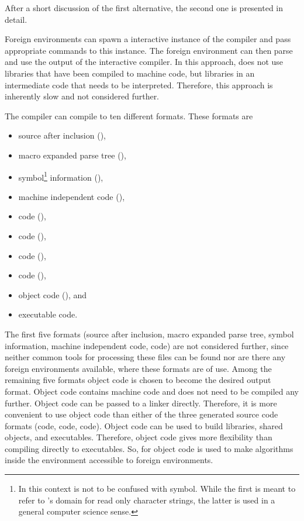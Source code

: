 After a short discussion of the first alternative, the second one is presented in detail.

Foreign environments can spawn a interactive instance of the \Aldor compiler and pass appropriate commands to this instance. The foreign environment can then parse and use the output of the interactive \Aldor compiler. In this approach, \Aldor does not use libraries that have been compiled to machine code, but libraries in an intermediate code that needs to be interpreted. Therefore, this approach is inherently slow and not considered further.

The \Aldor compiler can compile to ten different formats. These formats are
\begin{itemize}
\item source after inclusion (),
\item macro expanded parse tree (),
\item symbol\footnote{In this context  is not to be confused with symbol. While the first is meant to refer to \LibAldor's domain for read only character strings, the latter is used in a general computer science sense.} information (),
\item machine independent code (),
\item \Foam code (),
\item \Lisp code (),
\item \C code (),
\item \Cpp code (),
\item object code (), and
\item executable code.
\end{itemize}

The first five formats (source after inclusion, macro expanded parse tree, symbol information, machine independent code, \Foam code) are not considered further, since neither common tools for processing these files can be found nor are there any foreign environments available, where these formats are of use. Among the remaining five formats object code is chosen to become the desired output format. Object code contains machine code and does not need to be compiled any further. Object code can be passed to a linker directly. Therefore, it is more convenient to use object code than either of the three generated source code formats (\Lisp code, \C code, \Cpp code). Object code can be used to build libraries, shared objects, and executables. Therefore, object code gives more flexibility than compiling directly to executables. So, for \LibCharSet object code is used to make algorithms inside the \Aldor environment accessible to foreign environments.

